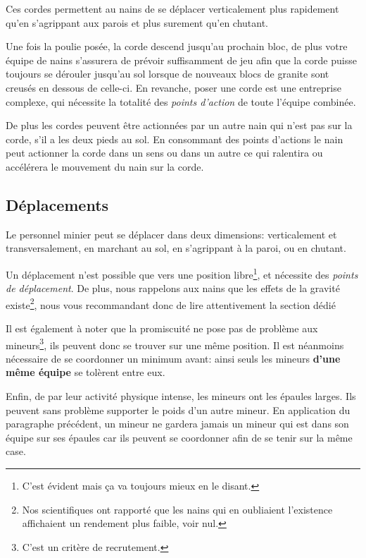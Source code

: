   Ces cordes permettent au nains de se déplacer verticalement plus rapidement
  qu'en s'agrippant aux parois et plus surement qu'en chutant.

  Une fois la poulie posée, la corde descend jusqu'au prochain bloc, de plus
  votre équipe de nains s'assurera de prévoir suffisamment de jeu afin que la
  corde puisse toujours se dérouler jusqu'au sol lorsque de nouveaux blocs de
  granite sont creusés en dessous de celle-ci. En revanche, poser une corde est
  une entreprise complexe, qui nécessite la totalité des \textit{points
  d'action} de toute l'équipe combinée.

  De plus les cordes peuvent être actionnées par un autre nain qui n'est pas
  sur la corde, s'il a les deux pieds au sol. En consommant des points
  d'actions le nain peut actionner la corde dans un sens ou dans un autre ce
  qui ralentira ou accélérera le mouvement du nain sur la corde.

\subsection{Déplacements}

  Le personnel minier peut se déplacer dans deux dimensions: verticalement et
  transversalement, en marchant au sol, en s'agrippant à la paroi, ou en
  chutant.

  Un déplacement n'est possible que vers une position libre\footnote{C'est
  évident mais ça va toujours mieux en le disant.}, et nécessite des
  \textit{points de déplacement}. De plus, nous rappelons aux nains que les
  effets de la gravité existe\footnote{Nos scientifiques ont rapporté que les
  nains qui en oubliaient l'existence affichaient un rendement plus faible,
  voir nul.}, nous vous recommandant donc de lire attentivement la section
  dédié

  Il est également à noter que la promiscuité ne pose pas de problème aux
  mineurs\footnote{C'est un critère de recrutement.}, ils peuvent donc se
  trouver sur une même position. Il est néanmoins nécessaire de se coordonner
  un minimum avant: ainsi seuls les mineurs \textbf{d'une même équipe} se
  tolèrent entre eux.

  Enfin, de par leur activité physique intense, les mineurs ont les épaules
  larges. Ils peuvent sans problème supporter le poids d'un autre mineur. En
  application du paragraphe précédent, un mineur ne gardera jamais un mineur
  qui est dans son équipe sur ses épaules car ils peuvent se coordonner afin de
  se tenir sur la même case.

